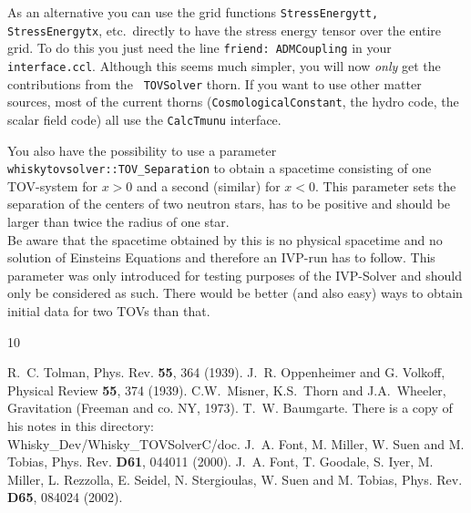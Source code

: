 As an alternative you can use the grid functions {\tt StressEnergytt,
  StressEnergytx}, etc.~directly to have the stress energy tensor over
the entire grid. To do this you just need the line {\tt friend:
  ADMCoupling} in your {\tt interface.ccl}. Although this seems much
simpler, you will now \emph{only} get the contributions from the {\tt
  TOVSolver} thorn. If you want to use other matter sources, most of
the current thorns ({\tt CosmologicalConstant}, the hydro code, the
scalar field code) all use the {\tt CalcTmunu} interface.

You also have the possibility to use a parameter
{\tt whiskytovsolver::TOV\_Separation} to obtain a spacetime consisting
of one TOV-system for $x>0$ and a second (similar) for $x<0$. This parameter
sets the separation of the centers of two neutron stars, has to be positive
and should be larger than twice the radius of one star.\\
Be aware that the spacetime obtained by this is no physical spacetime and
no solution of Einsteins Equations and therefore an IVP-run has to follow.
This parameter was only introduced for testing purposes of the IVP-Solver
and should only be considered as such. There would be better (and also easy)
ways to obtain initial data for two TOVs than that.





\begin{thebibliography}{10}

R.~C. Tolman, Phys. Rev. {\bf 55}, 364 (1939).
%
J.~R. Oppenheimer and G. Volkoff, Physical Review {\bf 55}, 374 (1939).
%
C.W.~Misner, K.S.~Thorn and J.A.~Wheeler, Gravitation (Freeman and co. NY, 1973).
%
T.~W. Baumgarte. There is a copy of his notes in this directory: \\
Whisky\_Dev/Whisky\_TOVSolverC/doc.
%
J.~A. Font, M. Miller, W. Suen and M. Tobias, Phys. Rev. {\bf D61},
044011 (2000).
%
J.~A. Font, T. Goodale, S. Iyer, M. Miller, L. Rezzolla, E. Seidel,
N. Stergioulas, W. Suen and M. Tobias, Phys. Rev. {\bf D65},
084024 (2002).


\end{thebibliography}








